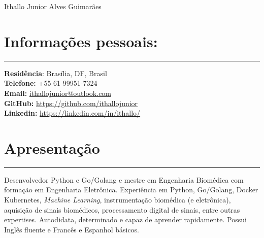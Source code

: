\documentclass[11pt]{article}
\begin{document}

\begin{center}
\huge{Ithallo Junior Alves Guimarães}
\end{center}


\section{Informações pessoais:}
\hrule \vspace{0.1cm}
\begin{addmargin}{0.5cm}
\textbf{Residência}: Brasília, DF, Brasil \\
\textbf{Telefone:}  +55 61 99951-7324 \\
\textbf{Email:}   \href{maito:ithallojunior@outlook.com}{ithallojunior@outlook.com} \\
\textbf{GitHub:} \url{https://github.com/ithallojunior} \\
\textbf{Linkedin:} \url{https://linkedin.com/in/ithallo/}
\end{addmargin}


\section{Apresentação}
\hrule \vspace{0.1cm}

\begin{addmargin}{0.5cm}

Desenvolvedor Python e Go/Golang e mestre em Engenharia Biomédica com formação em Engenharia Eletrônica. 
Experiência em Python, Go/Golang, Docker Kubernetes, \textit{Machine Learning}, instrumentação biomédica (e 
eletrônica), aquisição de sinais biomédicos, processamento digital de sinais,
entre outras expertises. Autodidata, determinado e 
capaz de aprender rapidamente. Possui Inglês fluente e Francês e Espanhol básicos.

\end{addmargin}

\end{document}

